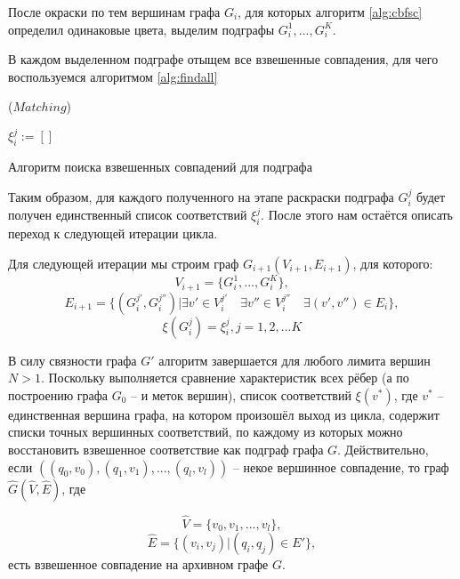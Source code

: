 После окраски по тем вершинам графа $G_i$, для которых алгоритм \ref{alg:cbfsc} определил одинаковые цвета, выделим подграфы $G_i^1, ..., G_i^K$.

В каждом выделенном подграфе отыщем все взвешенные совпадения, для чего воспользуемся алгоритмом \ref{alg:findall}

\begin{algorithm}[H]
	\Large
	\Begin($Matching$){
		
		$\xi_i^j := []$
		
		
	}
	
	\caption{Алгоритм поиска взвешенных совпадений для подграфа}
	\label{alg:findall}
\end{algorithm}

Таким образом, для каждого полученного на этапе раскраски подграфа $G_i^j$ будет получен единственный список соответствий $\xi_i^j$. После этого нам остаётся описать переход к следующей итерации цикла.

Для следующей итерации мы строим граф $G_{i+1}(V_{i+1}, E_{i+1})$, для которого:
\[V_{i+1} = \{G_i^1, ..., G_i^K\}, \]
\[E_{i+1} = \{(G_i^{j'}, G_i^{j''}) | \exists v' \in V_i^{j'} \quad \exists v'' \in V_i^{j''} \quad \exists (v', v'') \in E_i \}, \]
\[\xi(G_i^j) = \xi_i^j, j = 1, 2, ... K\]

В силу связности графа $G'$ алгоритм завершается для любого лимита вершин $N > 1$. Поскольку выполняется сравнение характеристик всех рёбер (а по построению графа $G_0$ -- и меток вершин), список соответствий $\xi(v^{*})$, где $v^{*}$ -- единственная вершина графа, на котором произошёл выход из цикла, содержит списки точных вершинных соответствий, по каждому из которых можно восстановить взвешенное соответствие как подграф графа $G$. Действительно, если $((q_0, v_0), (q_1, v_1), ..., (q_l, v_l))$ -- некое вершинное совпадение, то граф $\widehat{G}(\widehat{V}, \widehat{E})$, где

\[\widehat{V} = \{v_0, v_1, ..., v_l\},\]
\[\widehat{E} = \{(v_i, v_j) | (q_i, q_j) \in E'\},\]
есть взвешенное совпадение на архивном графе $G$.